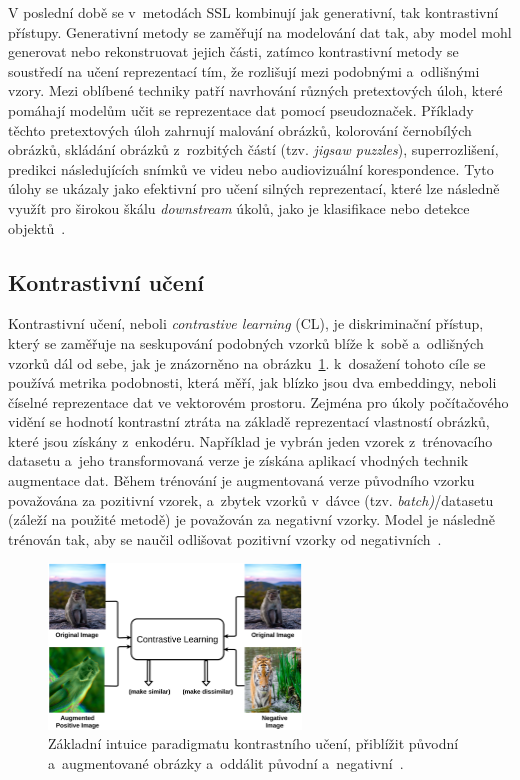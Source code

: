 V poslední době se v~metodách SSL kombinují jak generativní, tak kontrastivní přístupy. Generativní metody se zaměřují na modelování dat tak, aby model mohl generovat nebo rekonstruovat jejich části, zatímco kontrastivní metody se soustředí na učení reprezentací tím, že rozlišují mezi podobnými a~odlišnými vzory. Mezi oblíbené techniky patří navrhování různých pretextových úloh, které pomáhají modelům učit se reprezentace dat pomocí pseudoznaček. Příklady těchto pretextových úloh zahrnují malování obrázků, kolorování černobílých obrázků, skládání obrázků z~rozbitých částí (tzv. \textit{jigsaw puzzles}), superrozlišení, predikci následujících snímků ve videu nebo audiovizuální korespondence. Tyto úlohy se ukázaly jako efektivní pro učení silných reprezentací, které lze následně využít pro širokou škálu \textit{downstream} úkolů, jako je klasifikace nebo detekce objektů~\cite{technologies9010002}.

\subsection{Kontrastivní učení}
\label{contrastive_learning}
Kontrastivní učení, neboli \textit{contrastive learning} (CL), je diskriminační přístup, který se zaměřuje na seskupování podobných vzorků blíže k~sobě a~odlišných vzorků dál od sebe, jak je znázorněno na obrázku~\ref{cl}. k~dosažení tohoto cíle se používá metrika podobnosti, která měří, jak blízko jsou dva embeddingy, neboli číselné reprezentace dat ve vektorovém prostoru. Zejména pro úkoly počítačového vidění se hodnotí kontrastní ztráta na základě reprezentací vlastností obrázků, které jsou získány z~enkodéru. Například je vybrán jeden vzorek z~trénovacího datasetu a~jeho transformovaná verze je získána aplikací vhodných technik augmentace dat. Během trénování je augmentovaná verze původního vzorku považována za pozitivní vzorek, a~zbytek vzorků v~dávce (tzv. \textit{batch)}/datasetu (záleží na použité metodě) je považován za negativní vzorky. Model je následně trénován tak, aby se naučil odlišovat pozitivní vzorky od negativních~\cite{technologies9010002}.
\begin{figure}[hbt]
	\centering
	\includegraphics[width=0.6\textwidth]{obrazky-figures/cl.png}
	\caption{Základní intuice paradigmatu kontrastního učení, přiblížit původní a~augmentované obrázky a~oddálit původní a~negativní~\cite{technologies9010002}.}
	\label{cl}
\end{figure} 

